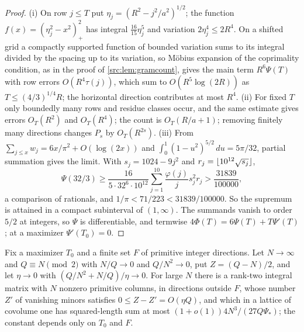 \begin{proof}
(i) On row $j\le T$ put $\eta_j=(R^2-j^2/a^2)^{1/2}$; the function $f(x)=(\eta_j^2-x^2)_+^2$ has integral
$\frac{16}{15}\eta_j^5$ and variation $2\eta_j^4\le2R^4$. On a shifted grid a compactly supported function of bounded
variation sums to its integral divided by the spacing up to its variation, so M\"obius expansion of the coprimality
condition, as in the proof of \cref{src:lem:gramcount}, gives the main term $R^6\Psi(T)$ with row errors
$O(R^4\tau(j))$, which sum to $O(R^5\log(2R))$ as $T\le(4/3)^{1/4}R$; the horizontal direction contributes at most
$R^4$. (ii) For fixed $T$ only boundedly many rows and residue classes occur, and the same estimate gives errors
$O_T(R^2)$ and $O_T(R^4)$; the count is $O_T(R/a+1)$; removing finitely many directions changes $P_s$ by
$O_T(R^{2s})$. (iii) From $\sum_{j\le x}w_j=6x/\pi^2+O(\log(2x))$ and $\int_0^1(1-u^2)^{5/2}\,du=5\pi/32$, partial
summation gives the limit. With $s_j=1024-9j^2$ and $r_j=\lfloor10^{12}\sqrt{s_j}\rfloor$,
\[
 \Psi(32/3)\ge\frac{16}{5\cdot32^6\cdot10^{12}}\sum_{j=1}^{10}\frac{\varphi(j)}js_j^2r_j>\frac{31839}{100000},
\]
a comparison of rationals, and $1/\pi<71/223<31839/100000$. So the supremum is attained in a compact subinterval of
$(1,\infty)$. The summands vanish to order $5/2$ at integers, so $\Psi$ is differentiable, and termwise
$4\Phi(T)=6\Psi(T)+T\Psi'(T)$; at a maximizer $\Psi'(T_0)=0$.
\end{proof}

\begin{lemma}\label{spn:lem:gramparabolic}
Fix a maximizer $T_0$ and a finite set $F$ of primitive integer directions. Let $N\to\infty$ and $Q\equiv N\pmod2$
with $N/Q\to0$ and $Q/N^2\to0$, put $Z=(Q-N)/2$, and let $\eta\to0$ with $(Q/N^2+N/Q)/\eta\to0$. For large $N$ there
is a rank-two integral matrix with $N$ nonzero primitive columns, in directions outside $F$, whose number $Z'$ of
vanishing minors satisfies $0\le Z-Z'=O(\eta Q)$, and which in a lattice of covolume one has squared-length sum
at most $(1+o(1))4N^3/(27Q\Psi_*)$; the constant depends only on $T_0$ and $F$.
\end{lemma}

